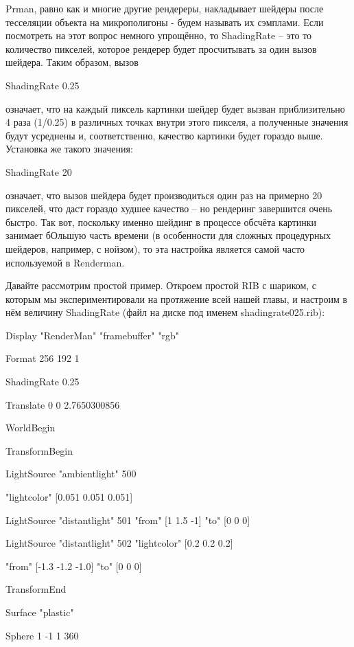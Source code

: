  Prman, равно как и многие другие рендереры,
    накладывает шейдеры после тесселяции объекта на микрополигоны -
    будем называть их сэмплами. Если посмотреть на этот вопрос немного
    упрощённо, то ShadingRate – это то количество пикселей, которое
    рендерер будет просчитывать за один вызов шейдера. Таким образом,
    вызов
  

ShadingRate 0.25
  

 означает, что на каждый пиксель картинки шейдер
    будет вызван приблизительно 4 раза (1/0.25) в различных точках
    внутри этого пикселя, а полученные значения будут усреднены и,
    соответственно, качество картинки будет гораздо выше. Установка же
    такого значения:
  

ShadingRate 20
  

 означает, что вызов шейдера будет производиться
    один раз на примерно 20 пикселей, что даст гораздо худшее качество
    – но рендеринг завершится очень быстро. Так вот, поскольку именно
    шейдинг в процессе обсчёта картинки занимает бОльшую часть времени
    (в особенности для сложных процедурных шейдеров, например, с
    нойзом), то эта настройка является самой часто используемой в
    Renderman.
  

 Давайте рассмотрим простой пример. Откроем простой
    RIB с шариком, с которым мы экспериментировали на протяжение всей
    нашей главы, и настроим в нём величину ShadingRate (файл на диске
    под именем shadingrate025.rib):
  

Display "RenderMan"
    "framebuffer" "rgb"
  

Format 256 192 1
  

ShadingRate 0.25
  

Translate 0 0
    2.7650300856
  

WorldBegin
  

  TransformBegin
  

    LightSource
    "ambientlight" 500
  

     "lightcolor" [0.051
    0.051 0.051]
  

    LightSource
    "distantlight" 501 "from" [1 1.5 -1] "to" [0 0 0]
  

    LightSource
    "distantlight" 502 "lightcolor" [0.2 0.2 0.2]
  

                "from" [-1.3 -1.2 -1.0] "to" [0 0 0]
  

  TransformEnd
  

  Surface "plastic"
  

  Sphere 1 -1 1 360
  

